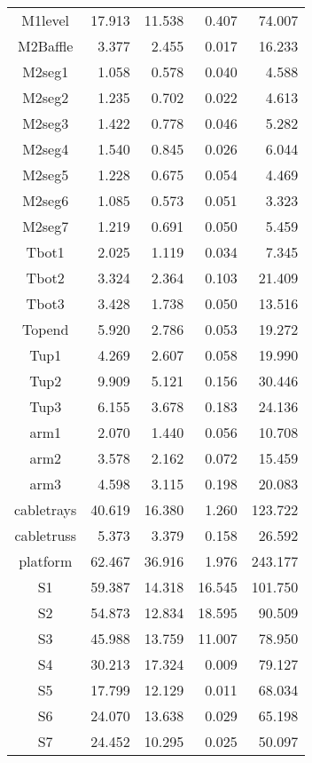 \begin{longtable}{crrrr}
 M1level & 17.913 & 11.538 & 0.407 & 74.007 \\
 M2Baffle & 3.377 & 2.455 & 0.017 & 16.233 \\
 M2seg1 & 1.058 & 0.578 & 0.040 & 4.588 \\
 M2seg2 & 1.235 & 0.702 & 0.022 & 4.613 \\
 M2seg3 & 1.422 & 0.778 & 0.046 & 5.282 \\
 M2seg4 & 1.540 & 0.845 & 0.026 & 6.044 \\
 M2seg5 & 1.228 & 0.675 & 0.054 & 4.469 \\
 M2seg6 & 1.085 & 0.573 & 0.051 & 3.323 \\
 M2seg7 & 1.219 & 0.691 & 0.050 & 5.459 \\
 Tbot1 & 2.025 & 1.119 & 0.034 & 7.345 \\
 Tbot2 & 3.324 & 2.364 & 0.103 & 21.409 \\
 Tbot3 & 3.428 & 1.738 & 0.050 & 13.516 \\
 Topend & 5.920 & 2.786 & 0.053 & 19.272 \\
 Tup1 & 4.269 & 2.607 & 0.058 & 19.990 \\
 Tup2 & 9.909 & 5.121 & 0.156 & 30.446 \\
 Tup3 & 6.155 & 3.678 & 0.183 & 24.136 \\
 arm1 & 2.070 & 1.440 & 0.056 & 10.708 \\
 arm2 & 3.578 & 2.162 & 0.072 & 15.459 \\
 arm3 & 4.598 & 3.115 & 0.198 & 20.083 \\
 cabletrays & 40.619 & 16.380 & 1.260 & 123.722 \\
 cabletruss & 5.373 & 3.379 & 0.158 & 26.592 \\
 platform & 62.467 & 36.916 & 1.976 & 243.177 \\
 S1 & 59.387 & 14.318 & 16.545 & 101.750 \\
 S2 & 54.873 & 12.834 & 18.595 & 90.509 \\
 S3 & 45.988 & 13.759 & 11.007 & 78.950 \\
 S4 & 30.213 & 17.324 & 0.009 & 79.127 \\
 S5 & 17.799 & 12.129 & 0.011 & 68.034 \\
 S6 & 24.070 & 13.638 & 0.029 & 65.198 \\
 S7 & 24.452 & 10.295 & 0.025 & 50.097 \\
\bottomrule
\end{longtable}


